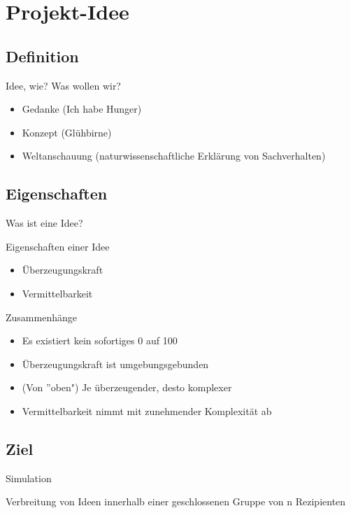 \section{Projekt-Idee}
\subsection{Definition}
\begin{frame}{Idee, wie? Was wollen wir?}
	\begin{itemize}
		\item<1> Gedanke (Ich habe Hunger)
		\item<2> Konzept (Glühbirne)
		\item<3> Weltanschauung (naturwissenschaftliche Erklärung von Sachverhalten)
	\end{itemize}
\end{frame}

\subsection{Eigenschaften}
\begin{frame}{Was ist eine Idee?}
	\begin{block}{Eigenschaften einer Idee}
		\begin{itemize}[<+->]
			\item Überzeugungskraft
			\item Vermittelbarkeit
		\end{itemize}
	\end{block}	
\end{frame}

\begin{frame}{Zusammenhänge}
	\begin{itemize}[<+->]
		\item Es existiert kein sofortiges 0 auf 100
		\item Überzeugungskraft ist umgebungsgebunden
		\item (Von ''oben") Je überzeugender, desto komplexer
		\item Vermittelbarkeit nimmt mit zunehmender Komplexität ab
	\end{itemize}
\end{frame}

\subsection{Ziel}
\begin{frame}{Simulation}
	\begin{block}{}
		Verbreitung von Ideen innerhalb einer geschlossenen Gruppe von n Rezipienten
	\end{block}
\end{frame}